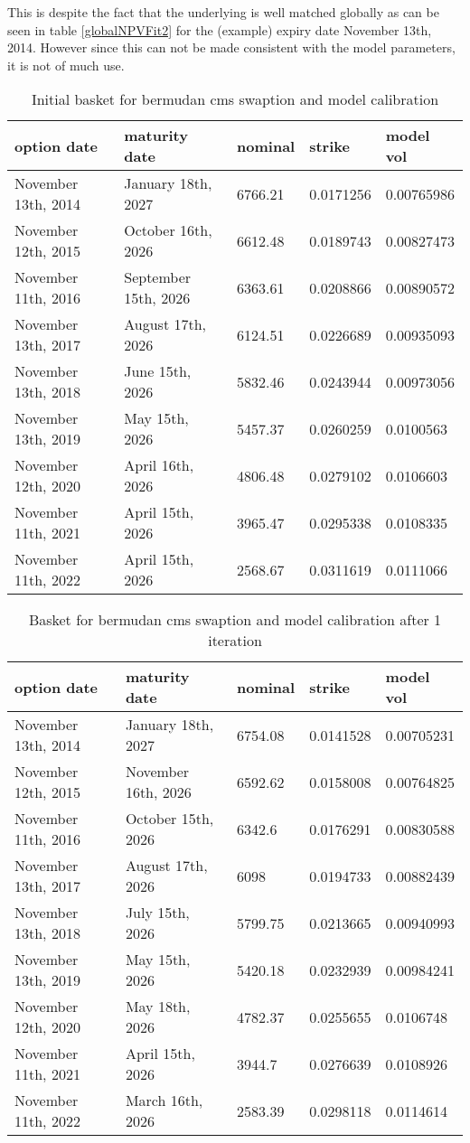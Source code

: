 \documentclass{amsart}
\theoremstyle{plain}
\numberwithin{equation}{section}
\begin{document}
This is despite the fact that the underlying is well matched globally as can be seen in table \ref{globalNPVFit2} for the (example) expiry date November 13th, 2014. However since this can not be made consistent with the model parameters, it is not of much use.

\begin{table}[ht]
\caption{Initial basket for bermudan cms swaption and model calibration}
\begin{tabular}{l | l | l | l | l}
option date & maturity date & nominal & strike & model vol \\ \hline
November 13th, 2014 & January 18th, 2027 & 6766.21 & 0.0171256 & 0.00765986 \\
November 12th, 2015 & October 16th, 2026 & 6612.48 & 0.0189743 & 0.00827473 \\
November 11th, 2016 & September 15th, 2026 & 6363.61 & 0.0208866 & 0.00890572 \\
November 13th, 2017 & August 17th, 2026 & 6124.51 & 0.0226689 & 0.00935093 \\
November 13th, 2018 & June 15th, 2026 & 5832.46 & 0.0243944 & 0.00973056 \\
November 13th, 2019 & May 15th, 2026 & 5457.37 & 0.0260259 & 0.0100563 \\
November 12th, 2020 & April 16th, 2026 & 4806.48 & 0.0279102 & 0.0106603 \\
November 11th, 2021 & April 15th, 2026 & 3965.47 & 0.0295338 & 0.0108335 \\
November 11th, 2022 & April 15th, 2026 & 2568.67 & 0.0311619 & 0.0111066
\end{tabular}
\label{cms1}
\end{table}

\begin{table}[ht]
\caption{Basket for bermudan cms swaption and model calibration after 1 iteration}
\begin{tabular}{l | l | l | l | l}
option date & maturity date & nominal & strike & model vol \\ \hline
November 13th, 2014 & January 18th, 2027 & 6754.08 & 0.0141528 & 0.00705231 \\
November 12th, 2015 & November 16th, 2026 & 6592.62 & 0.0158008 & 0.00764825 \\
November 11th, 2016 & October 15th, 2026 & 6342.6 & 0.0176291 & 0.00830588 \\
November 13th, 2017 & August 17th, 2026 & 6098 & 0.0194733 & 0.00882439 \\
November 13th, 2018 & July 15th, 2026 & 5799.75 & 0.0213665 & 0.00940993 \\
November 13th, 2019 & May 15th, 2026 & 5420.18 & 0.0232939 & 0.00984241 \\
November 12th, 2020 & May 18th, 2026 & 4782.37 & 0.0255655 & 0.0106748 \\
November 11th, 2021 & April 15th, 2026 & 3944.7 & 0.0276639 & 0.0108926 \\
November 11th, 2022 & March 16th, 2026 & 2583.39 & 0.0298118 & 0.0114614 \\
\end{tabular}
\label{cms2}
\end{table}
\end{document}
